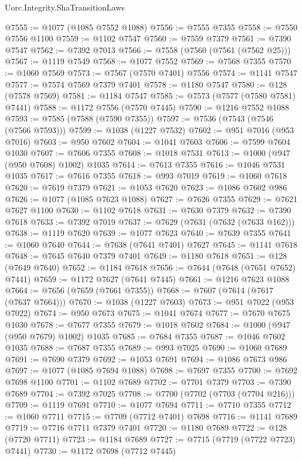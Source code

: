 \begin{lexlean}{Uorc.Integrity.ShaTransitionLaws}
\begin{coremodule}
@7555 := @1077 (@1085 @7552 @1088)
@7556 := @7555 @7355
@7558 := @7550 @7556 @1100
@7559 := @1102 @7547
@7560 := @7559 @7379
@7561 := @7390 @7547
@7562 := @7392 @7013
@7566 := @7558 (@7560 (@7561 (@7562 @25)))
@7567 := @1119 @7549
@7568 := @1077 @7552
@7569 := @7568 @7355
@7570 := @1060 @7569
@7573 := @7567 (@7570 @7401) @7556
@7574 := @1141 @7547
@7577 := @7574 @7569 @7379 @7401
@7578 := @1180 @7547
@7580 := @128 (@7578 @7569)
@7581 := @1184 @7547
@7585 := @7573 (@7577 (@7580 @7581) @7441)
@7588 := @1172 @7556 (@7570 @7445)
@7590 := @1216 @7552 @1088
@7593 := @7585 (@7588 (@7590 @7355))
@7597 := @7536 (@7543 (@7546 (@7566 @7593)))
@7599 := @1038 (@1227 @7532)
@7602 := @951 @7016 (@953 @7016)
@7603 := @950 @7602
@7604 := @1041 @7603
@7606 := @7599 @7604 @1030
@7607 := @7606 @7355
@7608 := @1018 @7531
@7613 := @1000 (@947 (@950 @7608) @1002) @1035
@7614 := @7613 @7355
@7616 := @1046 @7531 @1035
@7617 := @7616 @7355
@7618 := @993 @7019
@7619 := @1060 @7618
@7620 := @7619 @7379
@7621 := @1053 @7620
@7623 := @1086 @7602 @986
@7626 := @1077 (@1085 @7623 @1088)
@7627 := @7626 @7355
@7629 := @7621 @7627 @1100
@7630 := @1102 @7618
@7631 := @7630 @7379
@7632 := @7390 @7618
@7633 := @7392 @7019
@7637 := @7629 (@7631 (@7632 (@7633 @162)))
@7638 := @1119 @7620
@7639 := @1077 @7623
@7640 := @7639 @7355
@7641 := @1060 @7640
@7644 := @7638 (@7641 @7401) @7627
@7645 := @1141 @7618
@7648 := @7645 @7640 @7379 @7401
@7649 := @1180 @7618
@7651 := @128 (@7649 @7640)
@7652 := @1184 @7618
@7656 := @7644 (@7648 (@7651 @7652) @7441)
@7659 := @1172 @7627 (@7641 @7445)
@7661 := @1216 @7623 @1088
@7664 := @7656 (@7659 (@7661 @7355))
@7668 := @7607 (@7614 (@7617 (@7637 @7664)))
@7670 := @1038 (@1227 @7603)
@7673 := @951 @7022 (@953 @7022)
@7674 := @950 @7673
@7675 := @1041 @7674
@7677 := @7670 @7675 @1030
@7678 := @7677 @7355
@7679 := @1018 @7602
@7684 := @1000 (@947 (@950 @7679) @1002) @1035
@7685 := @7684 @7355
@7687 := @1046 @7602 @1035
@7688 := @7687 @7355
@7689 := @993 @7025
@7690 := @1060 @7689
@7691 := @7690 @7379
@7692 := @1053 @7691
@7694 := @1086 @7673 @986
@7697 := @1077 (@1085 @7694 @1088)
@7698 := @7697 @7355
@7700 := @7692 @7698 @1100
@7701 := @1102 @7689
@7702 := @7701 @7379
@7703 := @7390 @7689
@7704 := @7392 @7025
@7708 := @7700 (@7702 (@7703 (@7704 @216)))
@7709 := @1119 @7691
@7710 := @1077 @7694
@7711 := @7710 @7355
@7712 := @1060 @7711
@7715 := @7709 (@7712 @7401) @7698
@7716 := @1141 @7689
@7719 := @7716 @7711 @7379 @7401
@7720 := @1180 @7689
@7722 := @128 (@7720 @7711)
@7723 := @1184 @7689
@7727 := @7715 (@7719 (@7722 @7723) @7441)
@7730 := @1172 @7698 (@7712 @7445)

\end{coremodule}
\end{lexlean}
